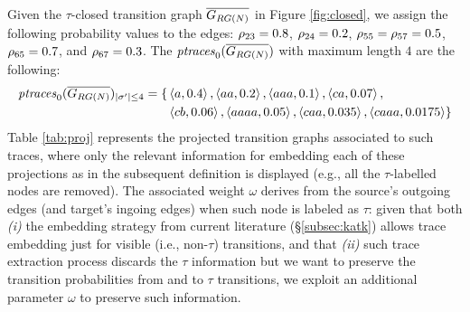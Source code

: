 \begin{example}\small\label{ex:neue}
Given the $\tau$-closed transition graph $\overline{G_{RG(N)}}$ in Figure \ref{fig:closed}, we assign the following probability values to the edges: $\rho_{23}=0.8$, $\rho_{24}=0.2$, $\rho_{55}=\rho_{57}=0.5$, $\rho_{65}=0.7$, and $\rho_{67}=0.3$. The $\mathit{ptraces}_{0}(\overline{G_{RG(N)}})$ with maximum length $4$ are the following:
$$\begin{aligned}
\mathit{ptraces}_{0}(\overline{G_{RG(N)}})_{|{\sigma'}|\leq 4}=\{&\braket{a,0.4},\braket{aa,0.2},\braket{aaa,0.1},\braket{ca,0.07},\\
&\braket{cb,0.06},\braket{aaaa,0.05},\braket{caa,0.035},\braket{caaa,0.0175}\}\\
\end{aligned}$$
Table \ref{tab:proj} represents the projected transition graphs associated to such traces, where only the relevant information for embedding each of these projections as in the subsequent definition is displayed (e.g., all the $\tau$-labelled nodes are removed). The associated weight $\omega$ derives from the source's outgoing edges (and target's ingoing edges) when such node is labeled as $\tau$: given that both \textit{(i)} the embedding strategy from current literature (\S\ref{subsec:katk}) allows trace embedding just for visible (i.e., non-$\tau$) transitions, and that \textit{(ii)} such trace extraction process discards the $\tau$ information but we want to preserve the transition probabilities from and to $\tau$ transitions, we exploit an additional parameter $\omega$ to preserve such information.
\end{example}
	
